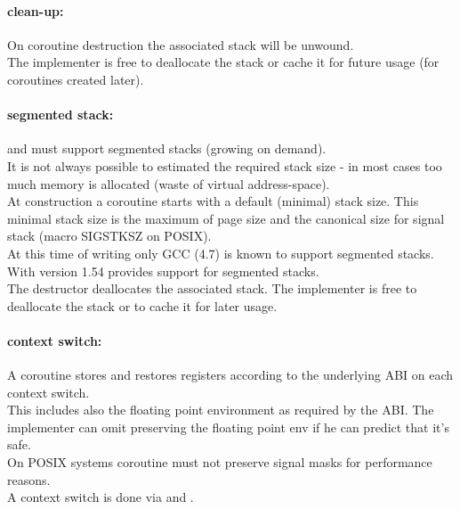 \paragraph*{clean-up:}
On coroutine destruction the associated stack will be unwound.\\
\newline
The implementer is free to deallocate the stack or cache it for future usage
(for coroutines created later).

\paragraph*{segmented stack:}
\pushcoro and \pullcoro must support segmented stacks (growing on demand).\\
\newline
It is not always possible to estimated the required stack size - in most cases
too much memory is allocated (waste of virtual address-space).\\
\newline
At construction a coroutine starts with a default (minimal) stack size. This
minimal stack size is the maximum of page size and the canonical size for signal
stack (macro SIGSTKSZ on POSIX).\\
\newline
At this time of writing only GCC (4.7)\cite{gccsplit} is known to support
segmented stacks. With version 1.54 \boostcoroutine provides support for
segmented stacks.\\
\newline
The destructor deallocates the associated stack. The implementer is free to
deallocate the stack or to cache it for later usage.

\paragraph*{context switch:}
A coroutine stores and restores registers according to the underlying ABI on
each context switch.\\
\newline
This includes also the floating point environment as required by the ABI. The
implementer can omit preserving the floating point env if he can predict that
it's safe.\\
\newline
On POSIX systems coroutine must not preserve signal masks for performance
reasons.\\
\newline
A context switch is done via \pushcoroop and \pullcoroop.


